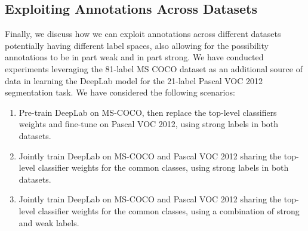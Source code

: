 

\subsection{Exploiting Annotations Across Datasets}
\label{sec:cross_dataset}

Finally, we discuss how we can exploit annotations across different
datasets potentially having different label spaces, also allowing for
the possibility annotations to be in part weak and in part strong. We
have conducted experiments leveraging the 81-label MS COCO dataset as
an additional source of data in learning the DeepLab model for the
21-label Pascal VOC 2012 segmentation task. We have considered the
following scenarios:
\begin{enumerate}
\item Pre-train DeepLab on MS-COCO, then replace the top-level
  classifiers weights and fine-tune on Pascal VOC 2012, using strong
  labels in both datasets.
\item Jointly train DeepLab on MS-COCO and Pascal VOC 2012 sharing
  the top-level classifier weights for the common classes, using
  strong labels in both datasets.
\item Jointly train DeepLab on MS-COCO and Pascal VOC 2012 sharing
  the top-level classifier weights for the common classes, using a
  combination of strong and weak labels.
\end{enumerate}

